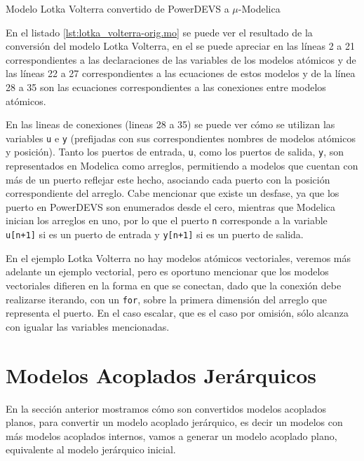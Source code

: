 \begin{listing}[H]
        \inputminted[linenos]{modelica}{src/lotka_volterra-orig.mo}
        \caption{Modelo Lotka Volterra convertido de PowerDEVS a $\mu$-Modelica}
        \label{lst:lotka_volterra-orig.mo}
\end{listing}

        En el listado \ref{lst:lotka_volterra-orig.mo} se puede ver el resultado de la conversión del modelo Lotka Volterra, en el se puede apreciar en las líneas 
        2 a 21 correspondientes a las declaraciones de las variables de los modelos atómicos y de las líneas 22 a 27 correspondientes a las ecuaciones de estos 
        modelos y de la línea 28 a 35 son las ecuaciones correspondientes a las conexiones entre modelos atómicos.

        En las lineas de conexiones (lineas 28 a 35) se puede ver cómo se utilizan las variables \texttt{u} e \texttt{y} (prefijadas con sus correspondientes nombres 
	de modelos atómicos y posición). Tanto los puertos de entrada, \texttt{u}, como los puertos de salida, \texttt{y}, son representados en Modelica como arreglos,
        permitiendo a modelos que cuentan con más de un puerto reflejar este hecho, asociando cada puerto con la posición correspondiente del arreglo. 
        Cabe mencionar que existe un desfase, ya que los puerto en PowerDEVS son enumerados desde el cero, mientras que Modelica inician los arreglos en uno, por lo
        que el puerto \texttt{n} corresponde a la variable \texttt{u[n+1]} si es un puerto de entrada y \texttt{y[n+1]} si es un puerto de salida.

        En el ejemplo Lotka Volterra no hay modelos atómicos vectoriales, veremos más adelante un ejemplo vectorial, pero es oportuno mencionar que los modelos
        vectoriales difieren en la forma en que se conectan, dado que la conexión debe realizarse iterando, con un \texttt{for}, sobre la primera dimensión del 
        arreglo que representa el puerto. En el caso escalar, que es el caso por omisión, sólo alcanza con igualar las variables mencionadas.


\section{Modelos Acoplados Jerárquicos} \label{aplanado}
        En la sección anterior mostramos cómo son convertidos modelos acoplados planos, para convertir un modelo acoplado jerárquico, es decir un modelos con más 
        modelos acoplados internos, vamos a generar un modelo acoplado plano, equivalente al modelo jerárquico inicial.

